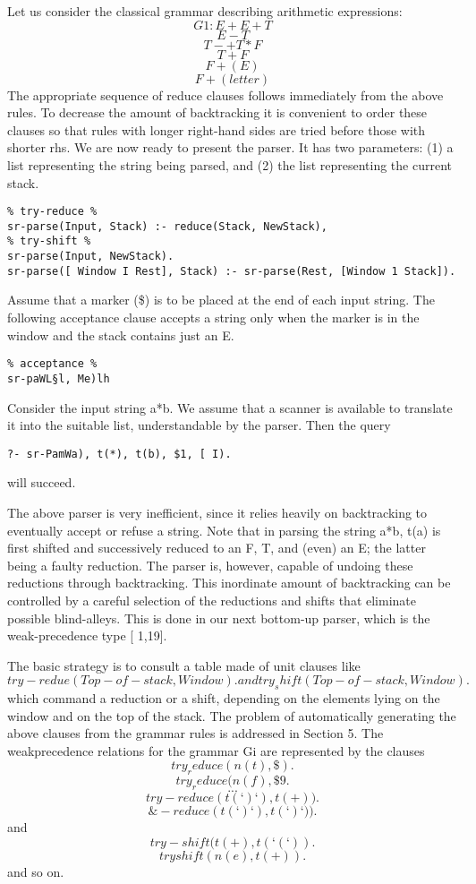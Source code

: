 Let us consider the classical grammar describing arithmetic expressions: 
\[G1: E+E+T\]
\[E-T\]
\[T-+ T*F\]
\[T+F\]
\[F + (E)\]
\[F + (letter)\]
The appropriate sequence of reduce clauses follows immediately from the above
rules. To decrease the amount of backtracking it is convenient to order these
clauses so that rules with longer right-hand sides are tried before those with 
shorter rhs. We are now ready to present the parser. It has two parameters:
(1) a list representing the string being parsed, and (2) the list representing the
current stack. 
\begin{verbatim}
% try-reduce %
sr-parse(Input, Stack) :- reduce(Stack, NewStack),
% try-shift %
sr-parse(Input, NewStack).
sr-parse([ Window I Rest], Stack) :- sr-parse(Rest, [Window 1 Stack]). 
\end{verbatim} 
Assume that a marker (\$) is to be placed at the end of each input string. The
following acceptance clause accepts a string only when the marker is in the
window and the stack contains just an E.
\begin{verbatim}
% acceptance %
sr-paWL§l, Me)lh 
\end{verbatim}
Consider the input string a*b. We assume that a scanner is available to translate
it into the suitable list, understandable by the parser. Then the query
\begin{verbatim}
?- sr-PamWa), t(*), t(b), $1, [ I).
\end{verbatim}
will succeed. 

The above parser is very inefficient, since it relies heavily on backtracking to
eventually accept or refuse a string. Note that in parsing the string a*b, t(a) is
first shifted and successively reduced to an F, T, and (even) an E; the latter
being a faulty reduction. The parser is, however, capable of undoing these
reductions through backtracking. This inordinate amount of backtracking can
be controlled by a careful selection of the reductions and shifts that eliminate
possible blind-alleys. This is done in our next bottom-up parser, which is the
weak-precedence type [ 1,19].

The basic strategy is to consult a table made of unit clauses like
\[try-redue(Top-of-stack, Window). and try_shift(Top-of-stack, Window).\]
which command a reduction or a shift, depending on the elements lying on the
window and on the top of the stack. The problem of automatically generating
the above clauses from the grammar rules is addressed in Section 5. The weakprecedence
relations for the grammar Gi are represented by the clauses 
\[try_reduce(n(t), \$).\]
\[try_reduce(n(f), \$9.\]
\[. . .\]
\[try-reduce(t(‘)‘), t(+)).\]
\[\&-reduce(t(‘)‘), t(‘)‘)).\]
and
\[try-shift(t(+), t(‘(‘)).\]
\[tryshift(n(e), t(+)).\]
and so on.    

